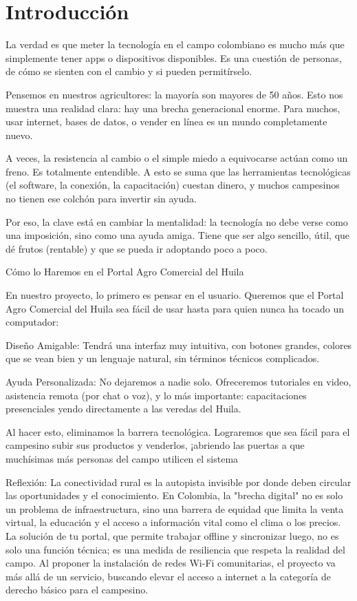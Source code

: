 \section{Introducción}

La verdad es que meter la tecnología en el campo colombiano es mucho más que simplemente tener apps o dispositivos disponibles. Es una cuestión de personas, de cómo se sienten con el cambio y si pueden permitírselo.

Pensemos en nuestros agricultores: la mayoría son mayores de 50 años. Esto nos muestra una realidad clara: hay una brecha generacional enorme. Para muchos, usar internet, bases de datos, o vender en línea es un mundo completamente nuevo.

A veces, la resistencia al cambio o el simple miedo a equivocarse actúan como un freno. Es totalmente entendible. A esto se suma que las herramientas tecnológicas (el software, la conexión, la capacitación) cuestan dinero, y muchos campesinos no tienen ese colchón para invertir sin ayuda.

Por eso, la clave está en cambiar la mentalidad: la tecnología no debe verse como una imposición, sino como una ayuda amiga. Tiene que ser algo sencillo, útil, que dé frutos (rentable) y que se pueda ir adoptando poco a poco.

Cómo lo Haremos en el Portal Agro Comercial del Huila

En nuestro proyecto, lo primero es pensar en el usuario. Queremos que el Portal Agro Comercial del Huila sea fácil de usar hasta para quien nunca ha tocado un computador:

Diseño Amigable: Tendrá una interfaz muy intuitiva, con botones grandes, colores que se vean bien y un lenguaje natural, sin términos técnicos complicados.

Ayuda Personalizada: No dejaremos a nadie solo. Ofreceremos tutoriales en video, asistencia remota (por chat o voz), y lo más importante: capacitaciones presenciales yendo directamente a las veredas del Huila.

Al hacer esto, eliminamos la barrera tecnológica. Lograremos que sea fácil para el campesino subir sus productos y venderlos, ¡abriendo las puertas a que muchísimas más personas del campo utilicen el sistema

Reflexión: La conectividad rural es la autopista invisible por donde deben circular las oportunidades y el conocimiento. En Colombia, la "brecha digital" no es solo un problema de infraestructura, sino una barrera de equidad que limita la venta virtual, la educación y el acceso a información vital como el clima o los precios. La solución de tu portal, que permite trabajar offline y sincronizar luego, no es solo una función técnica; es una medida de resiliencia que respeta la realidad del campo. Al proponer la instalación de redes Wi-Fi comunitarias, el proyecto va más allá de un servicio, buscando elevar el acceso a internet a la categoría de derecho básico para el campesino.

